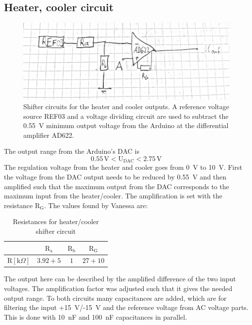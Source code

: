 \documentclass[12pt]{scrartcl}
\begin{document}
    \subsection{Heater, cooler circuit}
      \begin{figure}[H]
        \includegraphics[width = \textwidth]{circ2.png}
        \caption{Shifter circuits for the heater and cooler outputs. A reference
        voltage source REF03 and a voltage dividing circuit are used to subtract
        the 0.55~V minimum output voltage from the Arduino at the differential
        amplifier AD622.}
        \label{fig3}
      \end{figure}
      The output range from the Arduino's DAC is $$0.55\, \text{V} <
      \text{U}_{\text{DAC}} < 2.75\, \text{V}$$
      The regulation voltage from the heater and cooler goes from 0~V to 10~V. First the
      voltage from the DAC output needs to be reduced by 0.55~V and then amplified
      such that the maximum output from the DAC corresponds to the maximum input from
      the heater/cooler. The amplification is set with the resistance $\text{R}_\text{G}$.
      The values found by Vanessa are: \\
      \begin{table}[H] \label{hcres}
        \begin{tabular}{l|c c c}
          & $\text{R}_\text{a}$ & $\text{R}_\text{b}$ & $\text{R}_\text{G}$ \\
          \hline\vspace{5pt}
          $\text{R}[\text{k}\Omega]$ & $3.92 + 5$ & $1$ & $27+10$
        \end{tabular}
        \flushleft \caption{Resistances for heater/cooler shifter circuit}
      \end{table}
      \noindent The output here can be described by the amplified difference of the two
      input voltages. The amplification factor was adjusted such that it gives
      the needed output range.
      To both circuits many capacitances are added, which are for filtering
      the input +15~V/-15~V and the reference voltage from AC voltage parts. This is done with
      10~nF and 100~nF capacitances in parallel.
\end{document}

